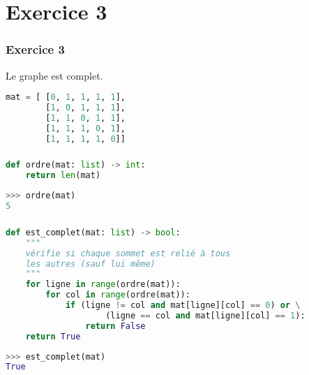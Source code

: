 \documentclass[svgnames,11pt]{beamer}
\begin{document}
\section{Exercice 3}
\begin{frame}[fragile]
    \frametitle{Exercice 3}
Le graphe est complet.
    
\begin{center}
\begin{lstlisting}[language=Python , basicstyle=\ttfamily\small, xleftmargin=2em, xrightmargin=2em]
mat = [ [0, 1, 1, 1, 1],
        [1, 0, 1, 1, 1],
        [1, 1, 0, 1, 1],
        [1, 1, 1, 0, 1],
        [1, 1, 1, 1, 0]]
\end{lstlisting}
\label{CODE}
\end{center}
\end{frame}
\begin{frame}[fragile]
    \frametitle{}

\begin{center}
\begin{lstlisting}[language=Python , basicstyle=\ttfamily\small, xleftmargin=2em, xrightmargin=2em]
def ordre(mat: list) -> int:
    return len(mat)
\end{lstlisting}
\end{center}    
\begin{center}
\begin{lstlisting}[language=Python , basicstyle=\ttfamily\small, xleftmargin=2em, xrightmargin=2em]
>>> ordre(mat)
5
\end{lstlisting}
\label{CODE}
\end{center}
\end{frame}
\begin{frame}[fragile]
    \frametitle{}

\begin{center}
\begin{lstlisting}[language=Python , basicstyle=\ttfamily\small, xleftmargin=0.2em, xrightmargin=-4em]
def est_complet(mat: list) -> bool:
    """
    vérifie si chaque sommet est relié à tous
    les autres (sauf lui même)
    """
    for ligne in range(ordre(mat)):
        for col in range(ordre(mat)):
            if (ligne != col and mat[ligne][col] == 0) or \
                    (ligne == col and mat[ligne][col] == 1):
                return False
    return True
\end{lstlisting}
\end{center}  
\begin{center}
\begin{lstlisting}[language=Python , basicstyle=\ttfamily\small, xleftmargin=2em, xrightmargin=2em]
>>> est_complet(mat)
True
\end{lstlisting}
\label{CODE}
\end{center}
\end{frame}
\end{document}
